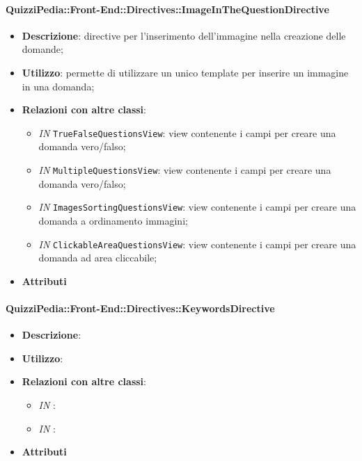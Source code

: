 \paragraph{QuizziPedia::Front-End::Directives::ImageInTheQuestionDirective}
\begin{itemize}
	\item \textbf{Descrizione}: directive per l'inserimento dell'immagine nella creazione delle domande;
	\item \textbf{Utilizzo}: permette di utilizzare un unico template per inserire un immagine in una domanda;
	\item \textbf{Relazioni con altre classi}:
	\begin{itemize}
		\item \textit{IN} \texttt{TrueFalseQuestionsView}: view contenente i campi per creare una domanda vero/falso; 
		\item \textit{IN} \texttt{MultipleQuestionsView}:  view contenente i campi per creare una domanda vero/falso; 
		\item \textit{IN} \texttt{ImagesSortingQuestionsView}: view contenente i campi per creare una domanda a ordinamento immagini;
		\item \textit{IN} \texttt{ClickableAreaQuestionsView}:  view contenente i campi per creare una domanda ad area cliccabile;
	\end{itemize}
	\item \textbf{Attributi}
\end{itemize}

\paragraph{QuizziPedia::Front-End::Directives::KeywordsDirective}
\begin{itemize}
	\item \textbf{Descrizione}:
	\item \textbf{Utilizzo}: 
	\item \textbf{Relazioni con altre classi}:
	\begin{itemize}
		\item \textit{IN} \texttt{}:  
		\item \textit{IN} \texttt{}: 
	\end{itemize}
	\item \textbf{Attributi}
\end{itemize}